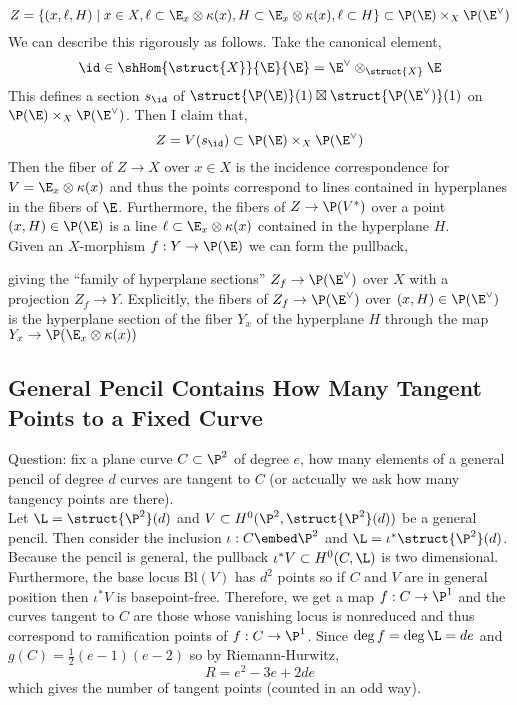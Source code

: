 \documentclass[12pt]{article}
\begin{document}
\[ Z = \{ (x, \ell, H) \mid x \in X, \ell \subset \E_x \otimes \kappa(x), H \subset \E_x \otimes \kappa(x), \ell \subset H \} \subset \P(\E) \times_X \P(\E^\vee) \]
We can describe this rigorously as follows. Take the canonical element,
\[ \id \in \shHom{\struct{X}}{\E}{\E} = \E^\vee \otimes_{\struct{X}} \E \]
This defines a section $s_{\id}$ of $\struct{\P(\E)}(1) \boxtimes \struct{\P(\E^\vee)}(1)$ on $\P(\E) \times_X \P(\E^\vee)$. Then I claim that,
\[ Z = V(s_{\id}) \subset \P(\E) \times_X \P(\E^\vee) \]
Then the fiber of $Z \to X$ over $x \in X$ is the incidence correspondence for $V = \E_x \otimes \kappa(x)$ and thus the points correspond to lines contained in hyperplanes in the fibers of $\E$. Furthermore, the fibers of $Z \to \P(V^*)$ over a point $(x, H) \in \P(\E)$ is a line $\ell \subset \E_x \otimes \kappa(x)$ contained in the hyperplane $H$.
\bigskip\\
Given an $X$-morphism $f : Y \to \P(\E)$ we can form the pullback, 
\begin{center}
\end{center}
giving the ``family of hyperplane sections'' $Z_f \to \P(\E^\vee)$ over $X$ with a projection $Z_f \to Y$. Explicitly, the fibers of $Z_f \to \P(\E^\vee)$ over $(x, H) \in \P(\E^\vee)$ is the hyperplane section of the fiber $Y_x$ of the hyperplane $H$ through the map $Y_x \to \P(\E_x \otimes \kappa(x))$ 

\subsection{General Pencil Contains How Many Tangent Points to a Fixed Curve}

Question: fix a plane curve $C \subset \P^2$ of degree $e$, how many elements of a general pencil of degree $d$ curves are tangent to $C$ (or actcually we ask how many tangency points are there). 
\bigskip\\
Let $\L = \struct{\P^2}(d)$ and $V \subset H^0(\P^2, \struct{\P^2}(d))$ be a general pencil. Then consider the inclusion $\iota : C \embed \P^2$ and $\L = \iota^* \struct{\P^2}(d)$. Because the pencil is general, the pullback $\iota^* V \subset H^0(C, \L)$ is two dimensional. Furthermore, the base locus $\mathrm{Bl}(V)$ has $d^2$ points so if $C$ and $V$ are in general position then $\iota^* V$ is basepoint-free. Therefore, we get a map $f : C \to \P^1$ and the curves tangent to $C$ are those whose vanishing locus is nonreduced and thus correspond to ramification points of $f : C \to \P^1$. Since $\deg{f} = \deg{\L} = de$ and $g(C) = \tfrac{1}{2} (e-1)(e-2)$ so by Riemann-Hurwitz,
\[ R = e^2 - 3 e + 2 de \]
which gives the number of tangent points (counted in an odd way). 
\end{document}
